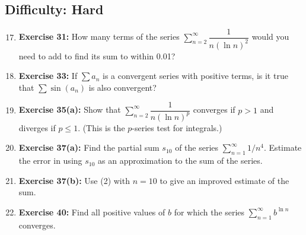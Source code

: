 \documentclass[12pt, a4paper]{article}
\begin{document}
\subsection*{Difficulty: Hard}
\begin{enumerate}
    \setcounter{enumi}{16}
    \item \textbf{Exercise 31:} How many terms of the series $\sum_{n=2}^{\infty} \dfrac{1}{n(\ln n)^2}$ would you need to add to find its sum to within 0.01?
    
    \item \textbf{Exercise 33:} If $\sum a_n$ is a convergent series with positive terms, is it true that $\sum \sin(a_n)$ is also convergent?

    \item \textbf{Exercise 35(a):} Show that $\sum_{n=2}^{\infty} \dfrac{1}{n (\ln n)^p}$ converges if $p > 1$ and diverges if $p \le 1$. (This is the $p$-series test for integrals.)
    
    \item \textbf{Exercise 37(a):} Find the partial sum $s_{10}$ of the series $\sum_{n=1}^{\infty} 1/n^4$. Estimate the error in using $s_{10}$ as an approximation to the sum of the series.
    
    \item \textbf{Exercise 37(b):} Use (2) with $n=10$ to give an improved estimate of the sum.
    
    \item \textbf{Exercise 40:} Find all positive values of $b$ for which the series $\sum_{n=1}^{\infty} b^{\ln n}$ converges.
\end{enumerate}
\end{document}
